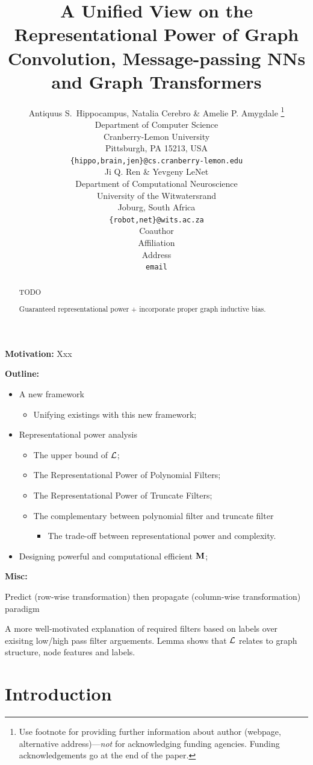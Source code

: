 \documentclass{article} %
\title{A Unified View on the Representational Power of Graph Convolution, Message-passing NNs and Graph Transformers}
\author{Antiquus S.~Hippocampus, Natalia Cerebro \& Amelie P. Amygdale \thanks{ Use footnote for providing further information
		about author (webpage, alternative address)---\emph{not} for acknowledging
		funding agencies.  Funding acknowledgements go at the end of the paper.} \\
	Department of Computer Science\\
	Cranberry-Lemon University\\
	Pittsburgh, PA 15213, USA \\
	\texttt{\{hippo,brain,jen\}@cs.cranberry-lemon.edu} \\
	\And
	Ji Q. Ren \& Yevgeny LeNet \\
	Department of Computational Neuroscience \\
	University of the Witwatersrand \\
	Joburg, South Africa \\
	\texttt{\{robot,net\}@wits.ac.za} \\
	\AND
	Coauthor \\
	Affiliation \\
	Address \\
	\texttt{email}
}
\begin{document}
\maketitle

\begin{abstract}
	TODO
	
	Guaranteed representational power + incorporate proper graph inductive bias.
\end{abstract}

{\color{orange}
	\textbf{Motivation:}
	Xxx
}

{\color{blue}
\textbf{Outline:}
\begin{itemize}
	\item
	A new framework
	\begin{itemize}
		\item
		Unifying existings with this new framework;
	\end{itemize}
	\item
	Representational power analysis
	\begin{itemize}
		\item
		The upper bound of ${\mathcal{L}}$;
		\item
		The Representational Power of Polynomial Filters;
		\item
		The Representational Power of Truncate Filters;
		\item
		The complementary between polynomial filter and truncate filter
		\begin{itemize}
			\item
			The trade-off between representational power and complexity.
		\end{itemize}
	\end{itemize}
	\item
	Designing powerful and computational efficient ${\mathbf{M}}$;
\end{itemize}
}

{\color{purple}
\textbf{Misc:}

Predict (row-wise transformation) then propagate (column-wise transformation) paradigm

A more well-motivated explanation of required filters based on labels over exisitng low/high pass filter arguements.
Lemma shows that ${\mathcal{L}}$ relates to graph structure, node features and labels.
}

\section{Introduction}
\end{document}
